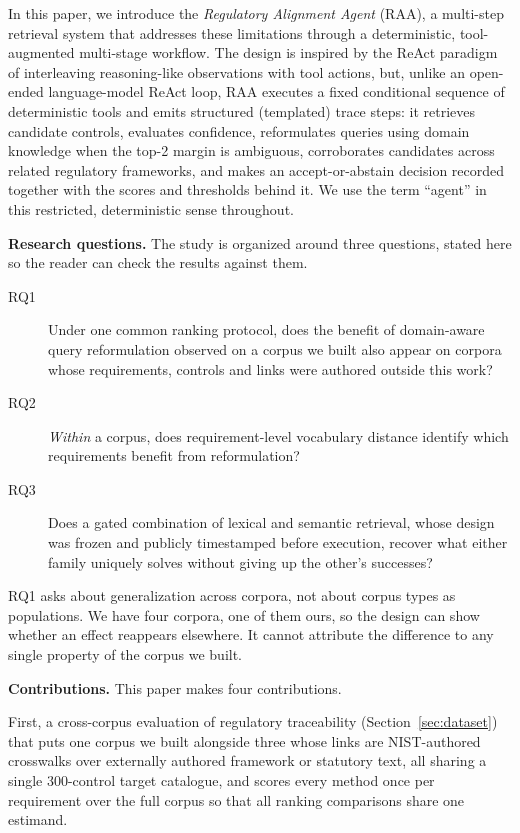 \documentclass[smallextended,natbib]{svjour3}
\begin{document}
In this paper, we introduce the \emph{Regulatory Alignment Agent} (RAA), a multi-step retrieval system that addresses these limitations through a deterministic, tool-augmented multi-stage workflow.
The design is inspired by the ReAct paradigm~\citep{Yao2023} of interleaving reasoning-like observations with tool actions, but, unlike an open-ended language-model ReAct loop, RAA executes a fixed conditional sequence of deterministic tools and emits structured (templated) trace steps: it retrieves candidate controls, evaluates confidence, reformulates queries using domain knowledge when the top-2 margin is ambiguous, corroborates candidates across related regulatory frameworks, and makes an accept-or-abstain decision recorded together with the scores and thresholds behind it. We use the term ``agent'' in this restricted, deterministic sense throughout.

\noindent\textbf{Research questions.}
The study is organized around three questions, stated here so the reader can check the results against them.

\begin{description}
\item[RQ1] Under one common ranking protocol, does the benefit of domain-aware query reformulation observed on a corpus we built also appear on corpora whose requirements, controls and links were authored outside this work?
\item[RQ2] \emph{Within} a corpus, does requirement-level vocabulary distance identify which requirements benefit from reformulation?
\item[RQ3] Does a gated combination of lexical and semantic retrieval, whose design was frozen and publicly timestamped before execution, recover what either family uniquely solves without giving up the other's successes?
\end{description}

RQ1 asks about generalization across corpora, not about corpus types as populations. We have four corpora, one of them ours, so the design can show whether an effect reappears elsewhere. It cannot attribute the difference to any single property of the corpus we built.

\noindent\textbf{Contributions.}
This paper makes four contributions.

First, a cross-corpus evaluation of regulatory traceability (Section~\ref{sec:dataset}) that puts one corpus we built alongside three whose links are NIST-authored crosswalks over externally authored framework or statutory text, all sharing a single 300-control target catalogue, and scores every method once per requirement over the full corpus so that all ranking comparisons share one estimand.
\end{document}
